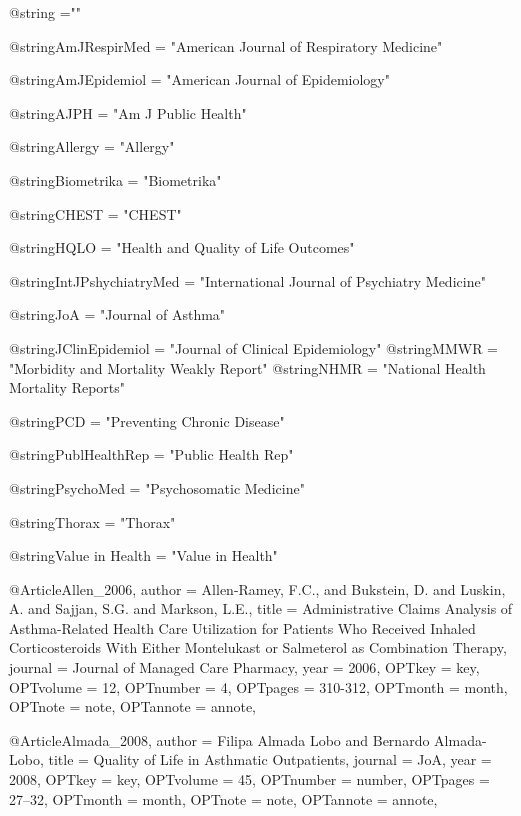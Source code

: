 @string{ ="" }


@string{AmJRespirMed = "American Journal of Respiratory Medicine"}

@string{AmJEpidemiol = "American Journal of Epidemiology"}

@string{AJPH = "Am J Public Health"}

@string{Allergy = "Allergy"}

@string{Biometrika = "Biometrika"}

@string{CHEST = "CHEST"}





@string{HQLO = "Health and Quality of Life Outcomes"}


@string{IntJPshychiatryMed = "International Journal of Psychiatry Medicine"}

@string{JoA = "Journal of Asthma"}

@string{JClinEpidemiol = "Journal of Clinical Epidemiology"}
@string{MMWR = "Morbidity and Mortality Weakly Report"}
@string{NHMR = "National Health Mortality Reports"}

@string{PCD = "Preventing Chronic Disease"}

@string{PublHealthRep = "Public Health Rep"}

@string{PsychoMed = "Psychosomatic Medicine"}

@string{Thorax = "Thorax"}

@string{Value in Health = "Value in Health"}



@Article{Allen_2006,
author = {Allen-Ramey, F.C., and Bukstein, D. and Luskin, A. and Sajjan, S.G. and Markson, L.E.},
title = {Administrative Claims Analysis of Asthma-Related Health Care Utilization for Patients Who Received Inhaled Corticosteroids With Either Montelukast or Salmeterol as Combination Therapy},
journal = {Journal of Managed Care Pharmacy},
year = {2006},
OPTkey = {key},
OPTvolume = {12},
OPTnumber = {4},
OPTpages = {310-312},
OPTmonth = {month},
OPTnote = {note},
OPTannote = {annote},
}

@Article{Almada_2008,
author = {Filipa Almada Lobo and Bernardo Almada-Lobo},
title = {Quality of Life in Asthmatic Outpatients},
journal = {JoA},
year = {2008},
OPTkey = {key},
OPTvolume = {45},
OPTnumber = {number},
OPTpages = {27–32},
OPTmonth = {month},
OPTnote = {note},
OPTannote = {annote},
}

